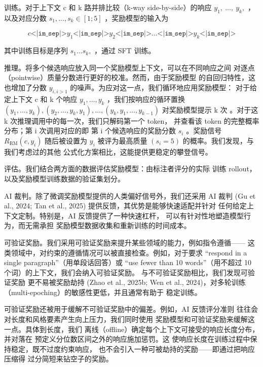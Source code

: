 \documentclass[
  10
]{article}
\begin{document}
训练。对于上下文 c 和 k 路并排比较（k-way side-by-side）的响应
\(y _ { 1 } , ~ . . . , ~ y _ { k } ,\) ，以及对应分数
\(s _ { 1 } , \ldots , s _ { k } \in [ 1 ; 5 ]\) ，奖励模型的输入为

\[
c \texttt{<|im\_sep|>} y_1 \texttt{<|im\_sep|>} y_2 \texttt{<|im\_sep|>} \ldots \texttt{<|im\_sep|>} y_k \texttt{<|im\_sep|>}
\]

其中训练目标是序列
\(s _ { 1 } \ldots s _ { k } ,\) ，通过 SFT 训练。

推理。将多个候选响应放入同一个奖励模型上下文，可以在不同响应之间
对逐点（pointwise）质量分数进行更好的校准。然而，由于奖励模型
的自回归特性，这也增加了分数
\(y _ { i , i > 1 }\) 的噪声。为应对这一点，我们循环地应用奖励模型：
对于给定上下文 c 和 k 个响应
\(y _ { 1 } , \ldots , y _ { k }\) ，我们按响应的循环置换
\(( y _ { 1 } , \dots , y _ { k } ) , ( y _ { 2 } , \dots , y _ { k } , y _ { 1 } ) , \dots , ( y _ { k } , y _ { 1 } , \dots , y _ { k - 1 } )\)
对奖励模型提示 k 次
。对于这 k 次推理调用中的每一次，我们只解码第一个 token，
并查看该 token 的完整概率分布；第 i 次调用对应的即
第 i 个候选响应的奖励分数 \(s _ { i }\) 。奖励信号
\(R _ { \mathrm { R M } } ( c , y _ { i } )\) 随后被设置为
\(y _ { i }\) 被评为最高质量
\(( s _ { i } = 5 )\) 的概率。我们发现，与我们考虑过的其他
公式化方案相比，这能提供更稳定的攀登信号。

评估。我们结合两方面的数据评估奖励模型：由标注者评分的实际
训练 rollout，以及奖励模型训练数据的验证集划分。

AI 裁判。除了微调奖励模型提供的人类偏好信号外，我们还采用
AI 裁判 (Gu et al., 2024; Tan et
al., 2025) 提供反馈，其优势是能够快速适配并针对
任何给定上下文定制。特别是，AI 反馈提供了一种快速杠杆，
可以有针对性地塑造模型行为，而无需承担
奖励模型数据收集和重新训练的时间成本。

可验证奖励。我们采用可验证奖励来提升某些领域的能力，例如指令遵循——
这类领域中，对约束的遵循情况可以被直接检查。例如，对于要求
``respond in a single paragraph''（用单段话回答）或 ``use fewer
than 10 words''（用不超过 10 个词）的上下文，我们会纳入可验证奖励。
与不可验证奖励相比，我们发现可验证奖励
更不易被奖励劫持 (Zhao et al., 2025b; Wen et
al., 2024)，对多轮训练（multi-epoching）的敏感性更低，并且通常有助于
稳定训练。

可验证奖励还被用于缓解不可验证奖励中的偏差。例如，AI 反馈评分准则
往往会对长度和风格要素产生向上压力，我们同时使用
奖励模型和可验证奖励来缓解这一点。具体到长度，我们
离线（offline）确定每个上下文可接受的响应长度分布，并对落在
预定义分位数区间之外的响应施加惩罚。这
使响应长度在训练过程中保持稳定，既不过度约束响应，
也不会引入一种可被劫持的奖励——即通过把响应压缩得
过分简短来钻空子的奖励。
\end{document}
